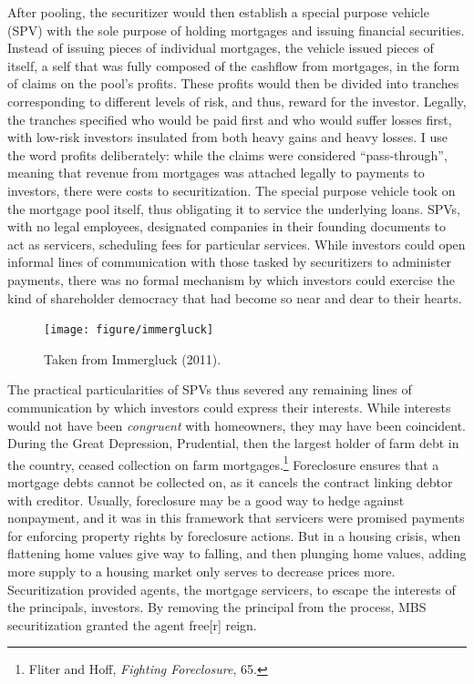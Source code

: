 \documentclass[12pt,oneside]{psthesis}
\begin{document}
After pooling, the securitizer would then establish a special purpose vehicle (SPV) with the sole purpose of holding mortgages and issuing financial securities.
Instead of issuing pieces of individual mortgages, the vehicle issued pieces of itself, a self that was fully composed of the cashflow from mortgages, in the form of claims on the pool's profits.
These profits would then be divided into tranches corresponding to different levels of risk, and thus, reward for the investor.
Legally, the tranches specified who would be paid first and who would suffer losses first, with low-risk investors insulated from both heavy gains and heavy losses.
I use the word profits deliberately: while the claims were considered ``pass-through'', meaning that revenue from mortgages was attached legally to payments to investors, there were costs to securitization.
The special purpose vehicle took on the mortgage pool itself, thus obligating it to service the underlying loans.
SPVs, with no legal employees, designated companies in their founding documents to act as servicers, scheduling fees for particular services.
While investors could open informal lines of communication with those tasked by securitizers to administer payments, there was no formal mechanism by which investors could exercise the kind of shareholder democracy that had become so near and dear to their hearts.
\begin{figure}

{\centering \texttt{[image: figure/immergluck]} 

}

\caption{Taken from Immergluck (2011).}\label{fig:immergluck}
\end{figure}
The practical particularities of SPVs thus severed any remaining lines of communication by which investors could express their interests.
While interests would not have been \emph{congruent} with homeowners, they may have been coincident.
During the Great Depression, Prudential, then the largest holder of farm debt in the country, ceased collection on farm mortgages.\footnote{Fliter and Hoff, \emph{Fighting Foreclosure}, 65.}
Foreclosure ensures that a mortgage debts cannot be collected on, as it cancels the contract linking debtor with creditor.
Usually, foreclosure may be a good way to hedge against nonpayment, and it was in this framework that servicers were promised payments for enforcing property rights by foreclosure actions.
But in a housing crisis, when flattening home values give way to falling, and then plunging home values, adding more supply to a housing market only serves to decrease prices more.
Securitization provided agents, the mortgage servicers, to escape the interests of the principals, investors.
By removing the principal from the process, MBS securitization granted the agent free{[}r{]} reign.
\end{document}
